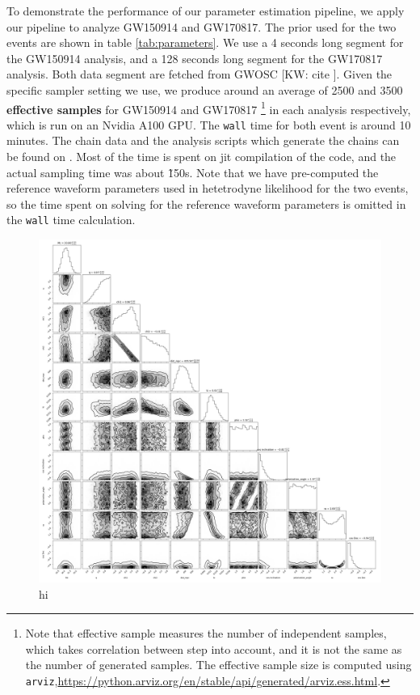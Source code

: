 \documentclass[twocolumn]{aastex631}
\newcommand{\kw}[1]{{\color{rb4}[KW: #1 ]}}
\begin{document}
To demonstrate the performance of our parameter estimation pipeline, we apply
our pipeline to analyze GW150914 and GW170817. The prior used for the two events
are shown in table \ref{tab:parameters}. We use a 4 seconds long segment for the
GW150914 analysis, and a 128 seconds long segment for the GW170817 analysis.
Both data segment are fetched from GWOSC \kw{cite}. Given the specific sampler
setting we use, we produce around an average of 2500 and 3500 \textbf{effective
samples} for GW150914 and GW170817 \footnote{Note that effective sample measures
the number of independent samples, which takes correlation between step into
account, and it is not the same as the number of generated samples. The
effective sample size is computed using
\texttt{arviz},\url{https://python.arviz.org/en/stable/api/generated/arviz.ess.html}.}
in each analysis respectively, which is run on an Nvidia A100 GPU. The
\texttt{wall} time for both event is around 10 minutes. The chain data and the
analysis scripts which generate the chains can be found on
. Most of the time is spent on jit compilation of the code, and the actual
sampling time was about \~150s. Note that we have pre-computed the reference
waveform parameters used in hetetrodyne likelihood for the two events, so the
time spent on solving for the reference waveform parameters is omitted in the
\texttt{wall} time calculation.

\begin{figure}
\includegraphics[width=0.99\linewidth]{static/GW150914.png}
\caption{
    hi
}
\label{fig:GW150914}
\end{figure}
\end{document}
